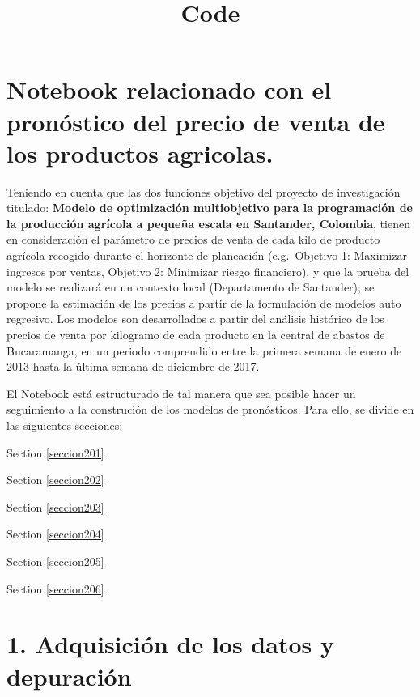 \documentclass[11pt]{article}
\title{Code}
\begin{document}
    
    
    \maketitle
    
    

    
    \hypertarget{notebook-relacionado-con-el-pronuxf3stico-del-precio-de-venta-de-los-productos-agricolas.}{%
\section{Notebook relacionado con el pronóstico del precio de venta de
los productos
agricolas.}\label{notebook-relacionado-con-el-pronuxf3stico-del-precio-de-venta-de-los-productos-agricolas.}}

    Teniendo en cuenta que las dos funciones objetivo del proyecto de
investigación titulado: \textbf{Modelo de optimización multiobjetivo
para la programación de la producción agrícola a pequeña escala en
Santander, Colombia}, tienen en consideración el parámetro de precios de
venta de cada kilo de producto agrícola recogido durante el horizonte de
planeación (e.g.~Objetivo 1: Maximizar ingresos por ventas, Objetivo 2:
Minimizar riesgo financiero), y que la prueba del modelo se realizará en
un contexto local (Departamento de Santander); se propone la estimación
de los precios a partir de la formulación de modelos auto regresivo. Los
modelos son desarrollados a partir del análisis histórico de los precios
de venta por kilogramo de cada producto en la central de abastos de
Bucaramanga, en un periodo comprendido entre la primera semana de enero
de 2013 hasta la última semana de diciembre de 2017.

    El Notebook está estructurado de tal manera que sea posible hacer un
seguimiento a la construción de los modelos de pronósticos. Para ello,
se divide en las siguientes secciones:

Section \ref{seccion201}

Section \ref{seccion202}

Section \ref{seccion203}

Section \ref{seccion204}

Section \ref{seccion205}

Section \ref{seccion206}

    \hypertarget{adquisiciuxf3n-de-los-datos-y-depuraciuxf3n}{%
\section{ 1. Adquisición de los datos y
depuración}\label{adquisiciuxf3n-de-los-datos-y-depuraciuxf3n}}
\end{document}
